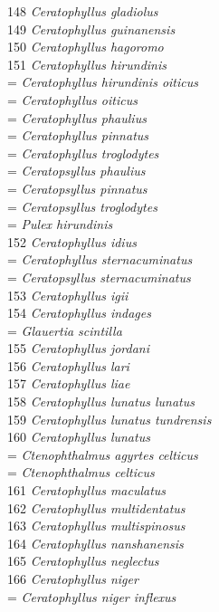\documentclass[
]{article}
\begin{document}
148 \emph{Ceratophyllus gladiolus}\\
149 \emph{Ceratophyllus guinanensis}\\
150 \emph{Ceratophyllus hagoromo}\\
151 \emph{Ceratophyllus hirundinis}\\
= \emph{Ceratophyllus hirundinis oiticus}\\
= \emph{Ceratophyllus oiticus}\\
= \emph{Ceratophyllus phaulius}\\
= \emph{Ceratophyllus pinnatus}\\
= \emph{Ceratophyllus troglodytes}\\
= \emph{Ceratopsyllus phaulius}\\
= \emph{Ceratopsyllus pinnatus}\\
= \emph{Ceratopsyllus troglodytes}\\
= \emph{Pulex hirundinis}\\
152 \emph{Ceratophyllus idius}\\
= \emph{Ceratophyllus sternacuminatus}\\
= \emph{Ceratopsyllus sternacuminatus}\\
153 \emph{Ceratophyllus igii}\\
154 \emph{Ceratophyllus indages}\\
= \emph{Glauertia scintilla}\\
155 \emph{Ceratophyllus jordani}\\
156 \emph{Ceratophyllus lari}\\
157 \emph{Ceratophyllus liae}\\
158 \emph{Ceratophyllus lunatus lunatus}\\
159 \emph{Ceratophyllus lunatus tundrensis}\\
160 \emph{Ceratophyllus lunatus}\\
= \emph{Ctenophthalmus agyrtes celticus}\\
= \emph{Ctenophthalmus celticus}\\
161 \emph{Ceratophyllus maculatus}\\
162 \emph{Ceratophyllus multidentatus}\\
163 \emph{Ceratophyllus multispinosus}\\
164 \emph{Ceratophyllus nanshanensis}\\
165 \emph{Ceratophyllus neglectus}\\
166 \emph{Ceratophyllus niger}\\
= \emph{Ceratophyllus niger inflexus}\\
\end{document}
